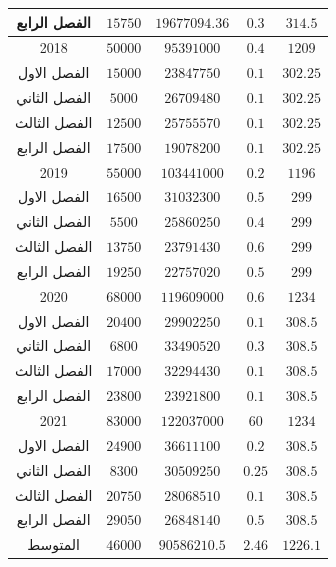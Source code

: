 \documentclass[10pt,a4paper]{report}
\begin{document}
\begin{longtable}{|c|c|c|c|c|}
	الفصل الرابع & $15750$              & $19677094.36$ & $0.3$       & $314.5$   \\ \hline
	2018         & $50000$              & $95391000$    & $0.4$       & $1209$    \\ \hline
	الفصل الاول  & $15000$              & $23847750$    & $0.1$       & $302.25$  \\ \hline
	الفصل الثاني & $5000$               & $26709480$    & $0.1$       & $302.25$  \\ \hline
	الفصل الثالث & $12500$              & $25755570$    & $0.1$       & $302.25$  \\ \hline
	الفصل الرابع & $17500$              & $19078200$    & $0.1$       & $302.25$  \\ \hline
	2019         & $55000$              & $103441000$   & $0.2$       & $1196$    \\ \hline
	الفصل الاول  & $16500$              & $31032300$    & $0.5$       & $299$     \\ \hline
	الفصل الثاني & $5500$               & $25860250$    & $0.4$       & $299$     \\ \hline
	الفصل الثالث & $13750$              & $23791430$    & $0.6$       & $299$     \\ \hline
	الفصل الرابع & $19250$              & $22757020$    & $0.5$       & $299$     \\ \hline
	2020         & $68000$              & $119609000$   & $0.6$       & $1234$    \\ \hline
	الفصل الاول  & $20400$              & $29902250$    & $0.1$       & $308.5$   \\ \hline
	الفصل الثاني & $6800$               & $33490520$    & $0.3$       & $308.5$   \\ \hline
	الفصل الثالث & $17000$              & $32294430$    & $0.1$       & $308.5$   \\ \hline
	الفصل الرابع & $23800$              & $23921800$    & $0.1$       & $308.5$   \\ \hline
	2021         & $83000$              & $122037000$   & $60$        & $1234$    \\ \hline
	الفصل الاول  & $24900$              & $36611100$    & $0.2$       & $308.5$   \\ \hline
	الفصل الثاني & $8300$               & $30509250$    & $0.25$      & $308.5$   \\ \hline
	الفصل الثالث & $20750$              & $28068510$    & $0.1$       & $308.5$   \\ \hline
	الفصل الرابع & $29050$              & $26848140$    & $0.5$       & $308.5$   \\ \hline
	\rowcolor[HTML]{DAE8FC} 
	المتوسط      & $46000$              & $90586210.5$  & $2.46$      & $1226.1$  \\ \hline
	
	
	
	
\end{longtable}
\end{document}
